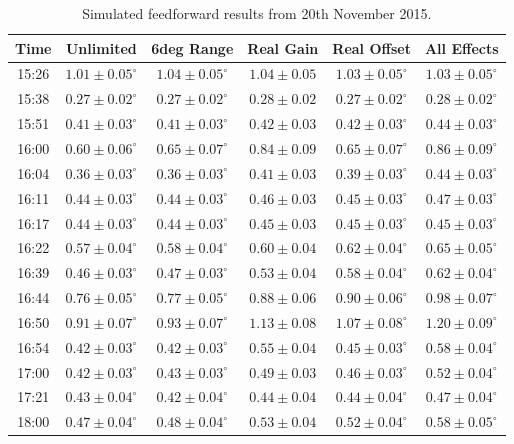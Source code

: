 \begin{table}
  \begin{center}
    \begin{tabular}{ c  c  c  c  c  c  }
	   \hline
       Time & Unlimited &  6deg Range &  Real Gain &  Real Offset &  All Effects \\ \hline
15:26 & \(1.01\pm0.05^\circ\) & \(1.04\pm0.05^\circ\) & \(1.04\pm0.05\) & \(1.03\pm0.05^\circ\) & \(1.03\pm0.05^\circ\) \\
15:38 & \(0.27\pm0.02^\circ\) & \(0.27\pm0.02^\circ\) & \(0.28\pm0.02\) & \(0.27\pm0.02^\circ\) & \(0.28\pm0.02^\circ\) \\
15:51 & \(0.41\pm0.03^\circ\) & \(0.41\pm0.03^\circ\) & \(0.42\pm0.03\) & \(0.42\pm0.03^\circ\) & \(0.44\pm0.03^\circ\) \\
16:00 & \(0.60\pm0.06^\circ\) & \(0.65\pm0.07^\circ\) & \(0.84\pm0.09\) & \(0.65\pm0.07^\circ\) & \(0.86\pm0.09^\circ\) \\
16:04 & \(0.36\pm0.03^\circ\) & \(0.36\pm0.03^\circ\) & \(0.41\pm0.03\) & \(0.39\pm0.03^\circ\) & \(0.44\pm0.03^\circ\) \\
16:11 & \(0.44\pm0.03^\circ\) & \(0.44\pm0.03^\circ\) & \(0.46\pm0.03\) & \(0.45\pm0.03^\circ\) & \(0.47\pm0.03^\circ\) \\
16:17 & \(0.44\pm0.03^\circ\) & \(0.44\pm0.03^\circ\) & \(0.45\pm0.03\) & \(0.45\pm0.03^\circ\) & \(0.45\pm0.03^\circ\) \\
16:22 & \(0.57\pm0.04^\circ\) & \(0.58\pm0.04^\circ\) & \(0.60\pm0.04\) & \(0.62\pm0.04^\circ\) & \(0.65\pm0.05^\circ\) \\
16:39 & \(0.46\pm0.03^\circ\) & \(0.47\pm0.03^\circ\) & \(0.53\pm0.04\) & \(0.58\pm0.04^\circ\) & \(0.62\pm0.04^\circ\) \\
16:44 & \(0.76\pm0.05^\circ\) & \(0.77\pm0.05^\circ\) & \(0.88\pm0.06\) & \(0.90\pm0.06^\circ\) & \(0.98\pm0.07^\circ\) \\
16:50 & \(0.91\pm0.07^\circ\) & \(0.93\pm0.07^\circ\) & \(1.13\pm0.08\) & \(1.07\pm0.08^\circ\) & \(1.20\pm0.09^\circ\) \\
16:54 & \(0.42\pm0.03^\circ\) & \(0.42\pm0.03^\circ\) & \(0.55\pm0.04\) & \(0.45\pm0.03^\circ\) & \(0.58\pm0.04^\circ\) \\
17:00 & \(0.42\pm0.03^\circ\) & \(0.43\pm0.03^\circ\) & \(0.49\pm0.03\) & \(0.46\pm0.03^\circ\) & \(0.52\pm0.04^\circ\) \\
17:21 & \(0.43\pm0.04^\circ\) & \(0.42\pm0.04^\circ\) & \(0.44\pm0.04\) & \(0.44\pm0.04^\circ\) & \(0.47\pm0.04^\circ\) \\
18:00 & \(0.47\pm0.04^\circ\) & \(0.48\pm0.04^\circ\) & \(0.53\pm0.04\) & \(0.52\pm0.04^\circ\) & \(0.58\pm0.05^\circ\) \\
    \end{tabular}
    \caption{Simulated feedforward results from 20th November 2015.}
  	\label{t:LongFFIndivSim}
  \end{center}
\end{table}


